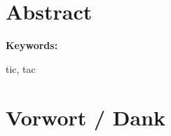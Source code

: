 \section*{Abstract}
\lipsum[1]

\vspace{2ex}

\textbf{Keywords:}

tic, tac

\clearpage

\section*{Vorwort / Dank}

\lipsum[2-5]

